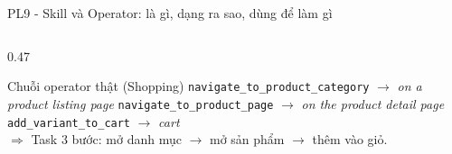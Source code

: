 \begin{frame}{PL9 - Skill và Operator: là gì, dạng ra sao, dùng để làm gì}
\begin{columns}[onlytextwidth,t]
\begin{column}{0.47\textwidth}
      \vspace{0.08cm}
      \begin{block}{Chuỗi operator thật (Shopping)}
        \scriptsize
        \texttt{navigate\_to\_product\_category} \newline
        \hspace*{0.3cm}$\rightarrow$ \textit{on a product listing page} \newline
        \texttt{navigate\_to\_product\_page} \newline
        \hspace*{0.3cm}$\rightarrow$ \textit{on the product detail page} \newline
        \texttt{add\_variant\_to\_cart} $\rightarrow$ \textit{cart} \\[0.08cm]
        $\Rightarrow$ Task 3 bước: mở danh mục $\rightarrow$ mở sản phẩm $\rightarrow$ thêm vào giỏ.
      \end{block}
    \end{column}
  \end{columns}
\end{frame}

